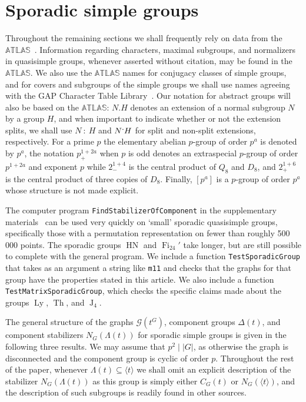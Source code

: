 \documentclass[11pt,a4paper]{amsart}
\theoremstyle{plain}
\theoremstyle{definition}
\theoremstyle{remark}
\newcounter{claim}[definition]
\theoremstyle{remark}
\theoremstyle{remark}
\theoremstyle{definition}
\def\cn{\mathord{{\!\:{:}\:\!}}}
\newcommand{\ns}{\mathbin{\mspace{-4mu}\vcenter{\hbox{\raisebox{1ex}{$\cdot$}}}\mspace{-4mu}}}
\newcommand{\GG}{\mathcal{G}}
\DeclareMathOperator{\Ly}{Ly}
\DeclareMathOperator{\HN}{HN}
\DeclareMathOperator{\J}{J}
\DeclareMathOperator{\Th}{Th}
\DeclareMathOperator{\Fi}{Fi}
\begin{document}
\section{Sporadic simple groups}\label{s:simple}
Throughout the remaining sections we shall frequently rely on data from the $\mathbb{ATLAS}$~\cite{atlas}. Information regarding characters, maximal subgroups, and normalizers in quasisimple groups, whenever asserted without citation, may be found in the $\mathbb{ATLAS}$. We also use the $\mathbb{ATLAS}$ names for conjugacy classes of simple groups, and for covers and subgroups of the simple groups we shall use names agreeing with the {\sf GAP} Character Table Library~\cite{CTblLib1.3.11}. Our notation for abstract groups will also be based on the $\mathbb{ATLAS}$: $N.H$ denotes an extension of a normal subgroup $N$ by a group $H$, and when important to indicate whether or not the extension splits, we shall use $N\cn H$ and $N\ns H$ for split and non-split extensions, respectively. For a prime $p$ the elementary abelian $p$-group of order $p^a$ is denoted by $p^a$, the notation $p^{1+2a}_+$ when $p$ is odd denotes an extraspecial $p$-group of order $p^{1+2a}$ and exponent $p$ while $2^{1+4}_-$ is the central product of $Q_8$ and $D_8$, and $2^{1+6}_+$ is the central product of three copies of $D_8$. Finally, $[p^a]$ is a $p$-group of order $p^a$ whose structure is not made explicit.

The computer program \texttt{FindStabilizerOfComponent} in the supplementary materials~\cite{codesup} can be used very quickly on `small' sporadic quasisimple groups, specifically those with a permutation representation on fewer than roughly 500 000 points. The sporadic groups $\HN$ and $\Fi_{24}'$ take longer, but are still possible to complete with the general program. We include a function \texttt{TestSporadicGroup} that takes as an argument a string like \texttt{m11} and checks that the graphs for that group have the properties stated in this article. We also include a function \texttt{TestMatrixSporadicGroup}, which checks the specific claims made about the groups $\Ly$, $\Th$, and $\J_4$.

The general structure of the graphs $\GG(t^G)$, component groups $\Delta(t)$, and component stabilizers $N_G(\Lambda(t))$ for sporadic simple groups is given in the following three results. We may assume that $p^2\mid |G|$, as otherwise the graph is disconnected and the component group is cyclic of order $p$. Throughout the rest of the paper, whenever $\Lambda(t)\subseteq\langle t\rangle$ we shall omit an explicit description of the stabilizer $N_G(\Lambda(t))$ as this group is simply either $C_G(t)$ or $N_G(\langle t\rangle)$, and the description of such subgroups is readily found in other sources.
\end{document}
